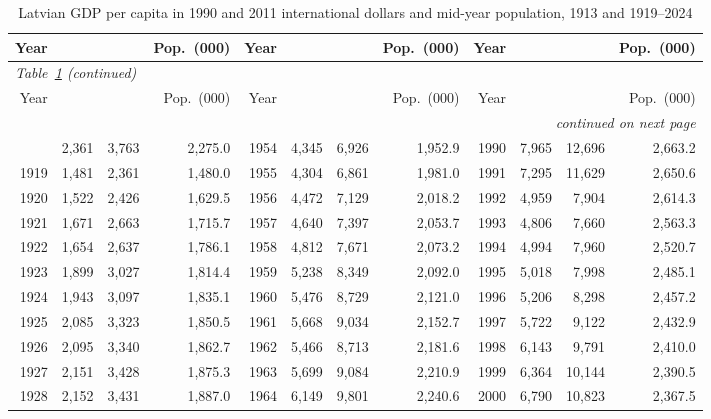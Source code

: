 \setlength{\tabcolsep}{3pt}
\begin{longtable}{rrrr@{\hspace{1em}}rrrr@{\hspace{1em}}rrrr}
\caption{Latvian GDP per capita in 1990 and 2011 international dollars and mid-year population, 1913 and 1919--2024}\label{tab:series}\\
\toprule
Year & \intlnineteen{} & \intltwenty{} & Pop.\ (000) & Year & \intlnineteen{} & \intltwenty{} & Pop.\ (000) & Year & \intlnineteen{} & \intltwenty{} & Pop.\ (000)
 \\
\midrule
\endfirsthead
\multicolumn{12}{l}{\textit{Table~\ref{tab:series} (continued)}} \\ \toprule
Year & \intlnineteen{} & \intltwenty{} & Pop.\ (000) & Year & \intlnineteen{} & \intltwenty{} & Pop.\ (000) & Year & \intlnineteen{} & \intltwenty{} & Pop.\ (000)
 \\
\midrule
\endhead
\midrule \multicolumn{12}{r}{\textit{continued on next page}} \\
\endfoot
\bottomrule
\endlastfoot
1913 & 2,361 & 3,763 & 2,275.0 & 1954 & 4,345 & 6,926 & 1,952.9 & 1990 & 7,965 & 12,696 & 2,663.2 \\
1919 & 1,481 & 2,361 & 1,480.0 & 1955 & 4,304 & 6,861 & 1,981.0 & 1991 & 7,295 & 11,629 & 2,650.6 \\
1920 & 1,522 & 2,426 & 1,629.5 & 1956 & 4,472 & 7,129 & 2,018.2 & 1992 & 4,959 & 7,904 & 2,614.3 \\
1921 & 1,671 & 2,663 & 1,715.7 & 1957 & 4,640 & 7,397 & 2,053.7 & 1993 & 4,806 & 7,660 & 2,563.3 \\
1922 & 1,654 & 2,637 & 1,786.1 & 1958 & 4,812 & 7,671 & 2,073.2 & 1994 & 4,994 & 7,960 & 2,520.7 \\
1923 & 1,899 & 3,027 & 1,814.4 & 1959 & 5,238 & 8,349 & 2,092.0 & 1995 & 5,018 & 7,998 & 2,485.1 \\
1924 & 1,943 & 3,097 & 1,835.1 & 1960 & 5,476 & 8,729 & 2,121.0 & 1996 & 5,206 & 8,298 & 2,457.2 \\
1925 & 2,085 & 3,323 & 1,850.5 & 1961 & 5,668 & 9,034 & 2,152.7 & 1997 & 5,722 & 9,122 & 2,432.9 \\
1926 & 2,095 & 3,340 & 1,862.7 & 1962 & 5,466 & 8,713 & 2,181.6 & 1998 & 6,143 & 9,791 & 2,410.0 \\
1927 & 2,151 & 3,428 & 1,875.3 & 1963 & 5,699 & 9,084 & 2,210.9 & 1999 & 6,364 & 10,144 & 2,390.5 \\
1928 & 2,152 & 3,431 & 1,887.0 & 1964 & 6,149 & 9,801 & 2,240.6 & 2000 & 6,790 & 10,823 & 2,367.5 \\

\end{longtable}
